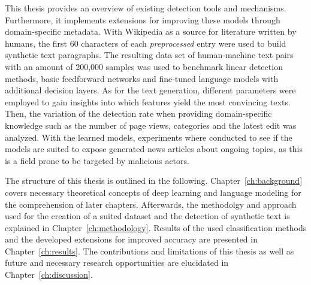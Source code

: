 This thesis provides an overview of existing detection tools and mechanisms. Furthermore, it implements extensions for improving these models through domain-specific metadata. With Wikipedia as a source for literature written by humans, the first 60 characters of each \textit{preprocessed} entry were used to build synthetic text paragraphs. The resulting data set of human-machine text pairs with an amount of 200,000 samples was used to benchmark linear detection methods, basic feedforward networks and fine-tuned language models with additional decision layers. As for the text generation, different parameters were employed to  gain insights into which features yield the most convincing texts. Then, the variation of the detection rate when providing domain-specific knowledge such as the number of page views, categories and the latest edit was analyzed. With the learned models, experiments where conducted to see if the models are suited to expose generated news articles about ongoing topics, as this is a field prone to be targeted by malicious actors.

The structure of this thesis is outlined in the following. Chapter~\ref{ch:background} covers necessary theoretical concepts of deep learning and language modeling for the comprehension of later chapters. Afterwards, the methodolgy and approach used for the creation of a suited dataset and the detection of synthetic text is explained in Chapter~\ref{ch:methodology}. Results of the used classification methods and the developed extensions for improved accuracy are presented in Chapter~\ref{ch:results}. The contributions and limitations of this thesis as well as future and necessary research opportunities are elucidated in Chapter~\ref{ch:discussion}.
